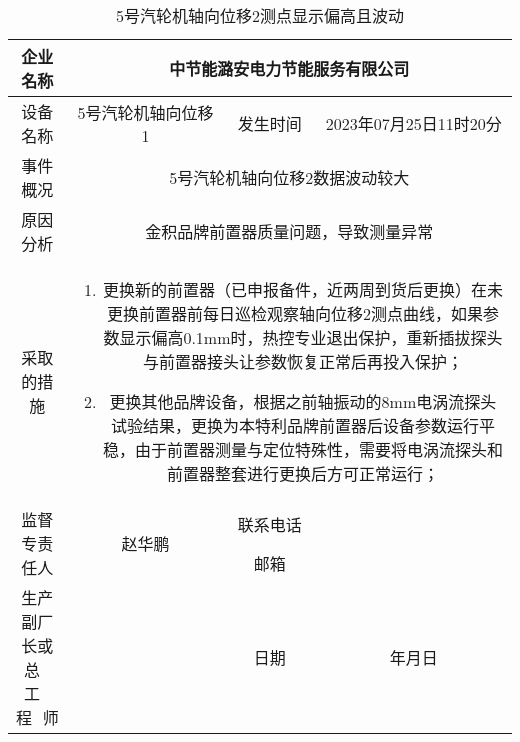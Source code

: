 \clearpage
\begin{table}[htbp]
	\centering
	\caption{5号汽轮机轴向位移2测点显示偏高且波动}\label{sec}
\begin{tabular}{|c|c|c|c|}
\hline
	企业名称 & \multicolumn{3}{|c|}{中节能潞安电力节能服务有限公司}\tabularnewline
\hline
	设备名称&5号汽轮机轴向位移1&发生时间&2023年07月25日11时20分\tabularnewline  
\hline
	事件概况&\multicolumn{3}{|c|}{
		\begin{minipage}[c][2ex][c]{35em}
		5号汽轮机轴向位移2数据波动较大
		\end{minipage}
	}\tabularnewline  
\hline
	原因分析&\multicolumn{3}{|c|}{金积品牌前置器质量问题，导致测量异常}\tabularnewline  
\hline
	采取的措施&\multicolumn{3}{|c|}{
\begin{minipage}[c][50ex][c]{35em}
			\begin{enumerate}
				\item 更换新的前置器（已申报备件，近两周到货后更换）在未更换前置器前每日巡检观察轴向位移2测点曲线，如果参数显示偏高0.1mm时，热控专业退出保护，重新插拔探头与前置器接头让参数恢复正常后再投入保护；
				\item 更换其他品牌设备，根据之前轴振动的8mm电涡流探头试验结果，更换为本特利品牌前置器后设备参数运行平稳，由于前置器测量与定位特殊性，需要将电涡流探头和前置器整套进行更换后方可正常运行；
			\end{enumerate}
		\end{minipage}
}\tabularnewline  
\hline
	\multirow{2}{*}{监督专责任人} & \multirow{2}{*}{赵华鹏}&联系电话&\tabularnewline  
	\cline{3-4}&&邮箱&\tabularnewline
\hline
	\parbox[c][8ex][c]{6em}{生产副厂长或\\总\,\,\,\,工\,\,\,\,程\,\,\,\,师}&&日期&年月日\tabularnewline  
\hline
\end{tabular}
\end{table}
\clearpage
